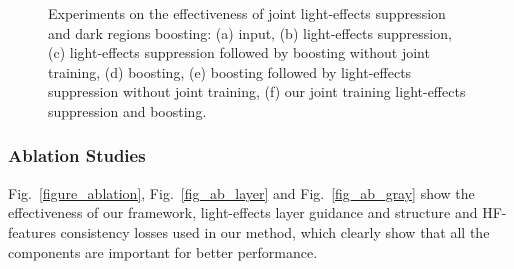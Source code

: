 \documentclass[runningheads]{llncs}
\begin{document}
\begin{figure}[t!]
\captionsetup[subfloat]{farskip=1pt}
	\setcounter{subfigure}{0}
	\hfill
	\hfill
	\hfill	
	\hfill
	\hfill
	\hfill
	\caption{Experiments on the effectiveness of joint light-effects suppression and  dark regions boosting:  (a) input, (b) light-effects suppression, (c) light-effects suppression followed by boosting without joint training, (d) boosting, (e) boosting followed by light-effects suppression without joint training, (f) our joint training light-effects suppression and boosting.}
	\label{figure_joint}
\end{figure} 

\subsubsection{Ablation Studies}
\label{sec_ablation}
Fig.~\ref{figure_ablation}, Fig.~\ref{fig_ab_layer} and Fig.~\ref{fig_ab_gray} show the effectiveness of our framework, light-effects layer guidance and structure and HF-features consistency losses used in our method, which clearly show that all the components are important for better performance.
\end{document}
